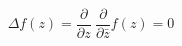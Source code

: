 \begin{equation}
\Delta f(z)=\frac{\partial}{\partial z} ~\frac{\partial}{\partial\bar{z}}f(z)=0
\end{equation}

